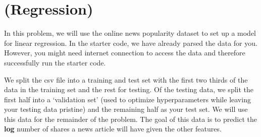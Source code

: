 \documentclass[189]{pset}
\begin{document}

  \section{(Regression)}
    In this problem, we will use the online news popularity dataset to
    set up a model for linear regression. In the starter code, we have
    already parsed the data for you. However, you might need internet
    connection to access the data and therefore successfully run the
    starter code.

    We split the csv file into a training and test set with the first
    two thirds of the data in the training set and the rest for
    testing. Of the testing data, we split the first half into a
    `validation set' (used to optimize hyperparameters while leaving
    your testing data pristine) and the remaining half as your test
    set. We will use this data for the remainder of the problem. The
    goal of this data is to predict the \textbf{log} number of shares
    a news article will have given the other features.
\end{document}
